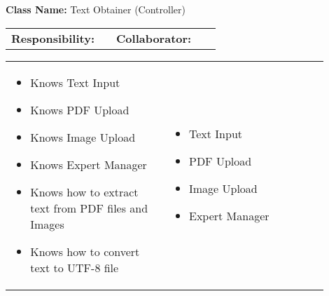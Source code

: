 \begin{cards}[]
    \textbf{Class Name:} Text Obtainer (Controller)
    \tcbline
    \begin{tabular}{p{0.45\linewidth} | p{0.45\linewidth}}
        \textbf{Responsibility:}& 
        \textbf{Collaborator:}\\
    \end{tabular}
    \tcbline
    \begin{tabular}{p{0.45\linewidth} | p{0.45\linewidth}}
        \begin{itemize}
            \item Knows Text Input
            \item Knows PDF Upload
            \item Knows Image Upload
            \item Knows Expert Manager
            \item Knows how to extract text from PDF files and Images
            \item Knows how to convert text to UTF-8 file
 
        \end{itemize}
        &
        \begin{itemize}
            \item Text Input
            \item PDF Upload
            \item Image Upload
            \item Expert Manager
             
        \end{itemize}
    \end{tabular}
\end{cards}